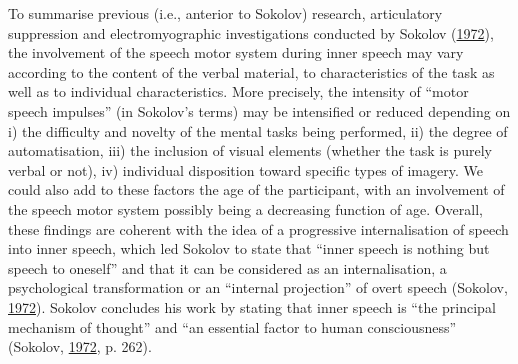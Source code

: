 \documentclass[a4paper,12pt,twoside,onecolumn,openright,final,oldfontcommands]{memoir}
\begin{document}
To summarise previous (i.e., anterior to Sokolov) research, articulatory suppression and electromyographic investigations conducted by Sokolov (\protect\hyperlink{ref-sokolov_inner_1972}{1972}), the involvement of the speech motor system during inner speech may vary according to the content of the verbal material, to characteristics of the task as well as to individual characteristics. More precisely, the intensity of \enquote{motor speech impulses} (in Sokolov's terms) may be intensified or reduced depending on i) the difficulty and novelty of the mental tasks being performed, ii) the degree of automatisation, iii) the inclusion of visual elements (whether the task is purely verbal or not), iv) individual disposition toward specific types of imagery. We could also add to these factors the age of the participant, with an involvement of the speech motor system possibly being a decreasing function of age. Overall, these findings are coherent with the idea of a progressive internalisation of speech into inner speech, which led Sokolov to state that \enquote{inner speech is nothing but speech to oneself} and that it can be considered as an internalisation, a psychological transformation or an \enquote{internal projection} of overt speech (Sokolov, \protect\hyperlink{ref-sokolov_inner_1972}{1972}). Sokolov concludes his work by stating that inner speech is \enquote{the principal mechanism of thought} and \enquote{an essential factor to human consciousness} (Sokolov, \protect\hyperlink{ref-sokolov_inner_1972}{1972}, p. 262).
\end{document}
